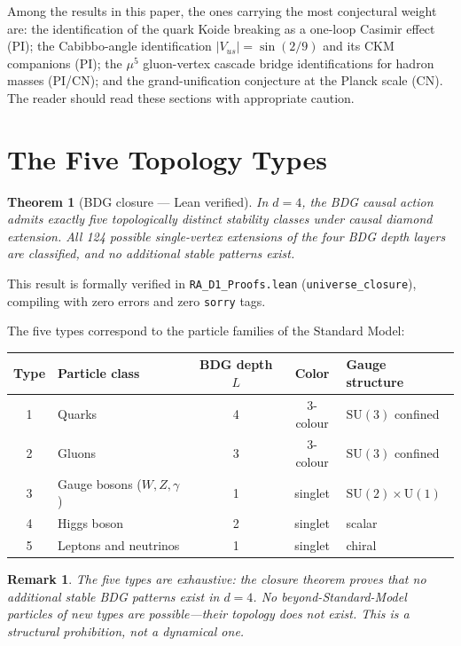 \documentclass[11pt]{article}
\newtheorem{remark}{Remark}
\newtheorem{theorem}{Theorem}
\begin{document}
Among the results in this paper, the ones carrying the most conjectural weight are: the identification of the quark Koide breaking as a one-loop Casimir effect (PI); the Cabibbo-angle identification $|V_{us}|=\sin(2/9)$ and its CKM companions (PI); the $\mu^5$ gluon-vertex cascade bridge identifications for hadron masses (PI/CN); and the grand-unification conjecture at the Planck scale (CN). The reader should read these sections with appropriate caution.

\section{The Five Topology Types}
\label{sec:five_types}

\begin{theorem}[BDG closure --- Lean verified]
\label{thm:closure}
In $d=4$, the BDG causal action admits exactly five topologically distinct stability classes under causal diamond extension. All 124 possible single-vertex extensions of the four BDG depth layers are classified, and no additional stable patterns exist.
\end{theorem}

This result is formally verified in \texttt{RA\_D1\_Proofs.lean} (\texttt{universe\_closure}), compiling with zero errors and zero \texttt{sorry} tags.

The five types correspond to the particle families of the Standard Model:

\begin{center}
\begin{tabular}{clccl}
\toprule
Type & Particle class & BDG depth $L$ & Color & Gauge structure \\
\midrule
1 & Quarks & 4 & 3-colour & $\mathrm{SU}(3)$ confined \\
2 & Gluons & 3 & 3-colour & $\mathrm{SU}(3)$ confined \\
3 & Gauge bosons ($W,Z,\gamma$) & 1 & singlet & $\mathrm{SU}(2)\times\mathrm{U}(1)$ \\
4 & Higgs boson & 2 & singlet & scalar \\
5 & Leptons and neutrinos & 1 & singlet & chiral \\
\bottomrule
\end{tabular}
\end{center}

\begin{remark}
The five types are exhaustive: the closure theorem proves that no additional stable BDG patterns exist in $d=4$. No beyond-Standard-Model particles of new types are possible---their topology does not exist. This is a structural prohibition, not a dynamical one.
\end{remark}
\end{document}
